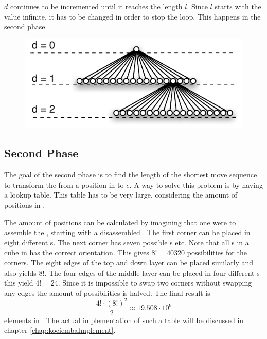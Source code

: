 $d$ continues to be incremented until it reaches the length $l$. Since $l$ starts with the value infinite, it has to be changed in order to stop the loop. This happens in the second phase.

\begin{figure}[!hbt]
	\centering
		\includegraphics[scale=0.75]{input/pics/searchExpansion.pdf}
	\caption{}
	\label{fig:searchExpansion}
\end{figure}


\subsection{Second Phase}
\label{sub:secondPhase}
The goal of the second phase is to find the length of the shortest move sequence to transform the \rubik{} from a position in  to $e$. A way to solve this problem is by having a lookup table. This table has to be very large, considering the amount of positions in . 

The amount of positions can be calculated by imagining that one were to assemble the \rubik{}, starting with a disassembled \rubik{}. The first corner \cpiece{} can be placed in eight different \cubicle{}s. The next corner has seven possible \cubicle{}s etc. Note that all \cpiece{}s in a cube in  has the correct orientation. 
This gives $8! = 40320$ possibilities for the corners. 
The eight edges of the top and down layer can be placed similarly and also yields $8!$.  
The four edges of the middle layer can be placed in four different \cubicle{}s this yield $4! = 24$. Since it is impossible to swap two corners without swapping any edges the amount of possibilities is halved. 
The final result is 
\begin{equation*}
\frac{4!\cdot(8!)^{2}}{2} \approx 19.508\cdot10^{9}
\end{equation*}
elements in .
The actual implementation of such a table will be discussed in chapter \ref{chap:kociembaImplement}.